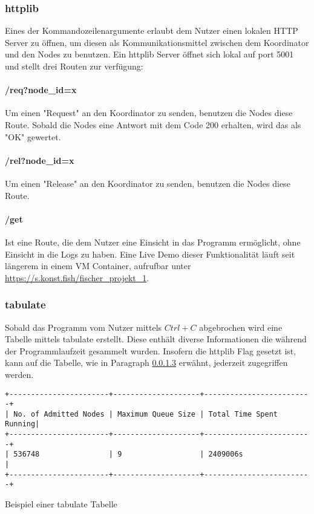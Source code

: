 \documentclass[12pt, letterpaper]{article}
\newenvironment{code}{\captionsetup{type=listing}}{}
\begin{document}
\subsubsection{httplib}
\label{httplib_ref}
Eines der Kommandozeilenargumente erlaubt dem Nutzer einen lokalen HTTP Server zu öffnen, um diesen als Kommunikationsmittel zwischen dem Koordinator und den Nodes zu benutzen.
Ein httplib\cite{httplib-ref} Server öffnet sich lokal auf port 5001 und stellt drei Routen zur verfügung:

\paragraph{/req?node\_id=x}
Um einen "Request" an den Koordinator zu senden, benutzen die Nodes diese Route. Sobald die Nodes eine Antwort mit dem Code 200 erhalten, wird das als "OK" gewertet.

\paragraph{/rel?node\_id=x}
Um einen "Release" an den Koordinator zu senden, benutzen die Nodes diese Route.

\paragraph{/get}
\label{get_ref}
Ist eine Route, die dem Nutzer eine Einsicht in das Programm ermöglicht, ohne Einsicht in die Logs zu haben. Eine Live Demo dieser Funktionalität läuft seit längerem in einem VM Container, aufrufbar unter \url{https://s.konst.fish/fischer_projekt_1}.

\subsubsection{tabulate}
Sobald das Programm vom Nutzer mittels $Ctrl+C$ abgebrochen wird eine Tabelle mittels tabulate\cite{tabulate-ref} erstellt. Diese enthält diverse Informationen die während der Programmlaufzeit gesammelt wurden.
Insofern die httplib Flag gesetzt ist, kann auf die Tabelle, wie in Paragraph \ref{get_ref} erwähnt, jederzeit zugegriffen werden.

\begin{code}
\begin{verbatim}
+-----------------------+--------------------+-------------------------+
| No. of Admitted Nodes | Maximum Queue Size | Total Time Spent Running|
+-----------------------+--------------------+-------------------------+
| 536748                | 9                  | 2409006s                |
+-----------------------+--------------------+-------------------------+
\end{verbatim}
\caption{Beispiel einer tabulate Tabelle}
\end{code}
\end{document}
